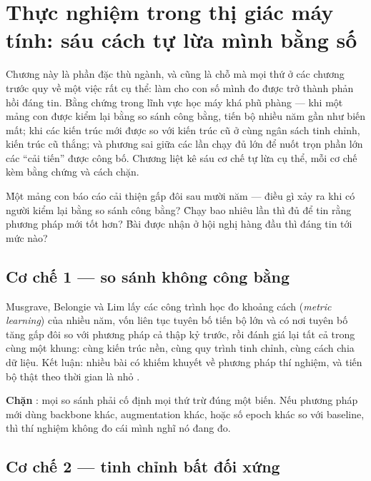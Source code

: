 \documentclass[../hieu-suat.tex]{subfiles}
\begin{document}
\chapter{Thực nghiệm trong thị giác máy tính: sáu cách tự lừa mình bằng số}

\begin{tomtat}
Chương này là phần đặc thù ngành, và cũng là chỗ mà mọi thứ ở các chương trước quy về một việc rất cụ thể: làm cho con số mình đo được trở thành phản hồi đáng tin. Bằng chứng trong lĩnh vực học máy khá phũ phàng --- khi một mảng con được kiểm lại bằng so sánh công bằng, tiến bộ nhiều năm gần như biến mất; khi các kiến trúc mới được so với kiến trúc cũ ở cùng ngân sách tinh chỉnh, kiến trúc cũ thắng; và phương sai giữa các lần chạy đủ lớn để nuốt trọn phần lớn các ``cải tiến'' được công bố. Chương liệt kê sáu cơ chế tự lừa cụ thể, mỗi cơ chế kèm bằng chứng và cách chặn.
\end{tomtat}

\begin{khoigoi}
\h{Một mảng con báo cáo cải thiện gấp đôi sau mười năm --- điều gì xảy ra khi có người kiểm lại bằng so sánh công bằng?}
\h{Chạy bao nhiêu lần thì đủ để tin rằng phương pháp mới tốt hơn?}
\h{Bài được nhận ở hội nghị hàng đầu thì đáng tin tới mức nào?}
\end{khoigoi}

\section{Cơ chế 1 --- so sánh không công bằng}

Musgrave, Belongie và Lim \cite{musgrave2020} lấy các công trình học đo khoảng cách (\emph{metric learning}) của nhiều năm, vốn liên tục tuyên bố tiến bộ lớn và có nơi tuyên bố tăng gấp đôi so với phương pháp cả thập kỷ trước, rồi đánh giá lại tất cả trong cùng một khung: cùng kiến trúc nền, cùng quy trình tinh chỉnh, cùng cách chia dữ liệu. Kết luận: nhiều bài có khiếm khuyết về phương pháp thí nghiệm, và tiến bộ thật theo thời gian là nhỏ \nD{}.

\textbf{Chặn} \nM{}: mọi so sánh phải cố định mọi thứ trừ đúng một biến. Nếu phương pháp mới dùng backbone khác, augmentation khác, hoặc số epoch khác so với baseline, thì thí nghiệm không đo cái mình nghĩ nó đang đo.

\section{Cơ chế 2 --- tinh chỉnh bất đối xứng}
\end{document}
